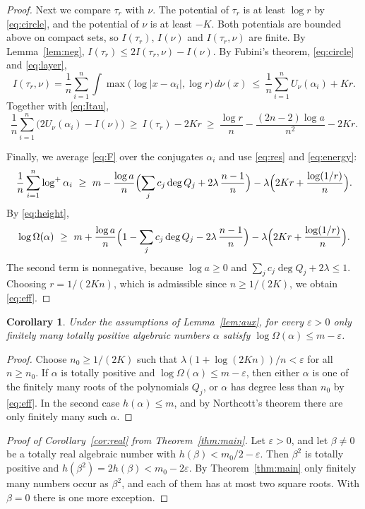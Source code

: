 \documentclass[11pt]{amsart}
\newtheorem{corollary}[theorem]{Corollary}
\theoremstyle{remark}
\numberwithin{equation}{section}
\newcommand{\logp}{\log^{+}}
\begin{document}
\begin{proof}
Next we compare $\tau_r$ with $\nu$. The potential of $\tau_r$ is at least $\log r$ by \eqref{eq:circle}, and the potential of $\nu$ is at least $-K$. Both potentials are bounded above on compact sets, so $I(\tau_r)$, $I(\nu)$ and $I(\tau_r,\nu)$ are finite. By Lemma~\ref{lem:neg}, $I(\tau_r)\le2I(\tau_r,\nu)-I(\nu)$. By Fubini's theorem, \eqref{eq:circle} and \eqref{eq:layer},
\[
I(\tau_r,\nu)=\frac1n\sum_{i=1}^n\int\max\bigl(\log|x-\alpha_i|,\log r\bigr)\,d\nu(x)\ \le\ \frac1n\sum_{i=1}^nU_\nu(\alpha_i)+Kr.
\]
Together with \eqref{eq:Itau},
\begin{equation}\label{eq:energy}
\frac1n\sum_{i=1}^n\bigl(2U_\nu(\alpha_i)-I(\nu)\bigr)\ \ge\ I(\tau_r)-2Kr\ \ge\ \frac{\log r}n-\frac{(2n-2)\log a}{n^2}-2Kr.
\end{equation}

Finally, we average \eqref{eq:F} over the conjugates $\alpha_i$ and use \eqref{eq:res} and \eqref{eq:energy}:
\[
\frac1n\sum_{i=1}^n\logp\alpha_i\ \ge\ m-\frac{\log a}n\Bigl(\sum_jc_j\deg Q_j+2\lambda\,\frac{n-1}n\Bigr)-\lambda\Bigl(2Kr+\frac{\log(1/r)}n\Bigr).
\]
By \eqref{eq:height},
\[
\log\Omega(\alpha)\ \ge\ m+\frac{\log a}n\Bigl(1-\sum_jc_j\deg Q_j-2\lambda\,\frac{n-1}n\Bigr)-\lambda\Bigl(2Kr+\frac{\log(1/r)}n\Bigr).
\]
The second term is nonnegative, because $\log a\ge0$ and $\sum_jc_j\deg Q_j+2\lambda\le1$. Choosing $r=1/(2Kn)$, which is admissible since $n\ge1/(2K)$, we obtain \eqref{eq:eff}.
\end{proof}

\begin{corollary}\label{cor:fin}
Under the assumptions of Lemma~\ref{lem:aux}, for every $\varepsilon>0$ only finitely many totally positive algebraic numbers $\alpha$ satisfy $\log\Omega(\alpha)\le m-\varepsilon$.
\end{corollary}

\begin{proof}
Choose $n_0\ge1/(2K)$ such that $\lambda(1+\log(2Kn))/n<\varepsilon$ for all $n\ge n_0$. If $\alpha$ is totally positive and $\log\Omega(\alpha)\le m-\varepsilon$, then either $\alpha$ is one of the finitely many roots of the polynomials $Q_j$, or $\alpha$ has degree less than $n_0$ by \eqref{eq:eff}. In the second case $h(\alpha)\le m$, and by Northcott's theorem \cite[Theorem~1.6.8]{BG06} there are only finitely many such $\alpha$.
\end{proof}

\begin{proof}[Proof of Corollary~\ref{cor:real} from Theorem~\ref{thm:main}]
Let $\varepsilon>0$, and let $\beta\ne0$ be a totally real algebraic number with $h(\beta)<m_0/2-\varepsilon$. Then $\beta^2$ is totally positive and $h(\beta^2)=2h(\beta)<m_0-2\varepsilon$. By Theorem~\ref{thm:main} only finitely many numbers occur as $\beta^2$, and each of them has at most two square roots. With $\beta=0$ there is one more exception.
\end{proof}
\end{document}
